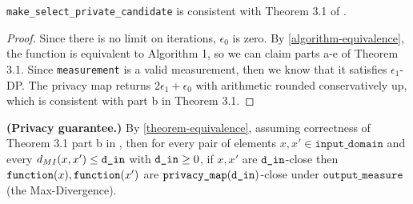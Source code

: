 \documentclass{article}
\begin{document}
\begin{theorem}
    \label{theorem-equivalence}
    \texttt{make\_select\_private\_candidate} is consistent with Theorem 3.1 of \cite{liu2018privateselectionprivatecandidates}.
\end{theorem}

\begin{proof}
    Since there is no limit on iterations, $\epsilon_0$ is zero.
    By \ref{algorithm-equivalence}, the function is equivalent to Algorithm 1, so we can claim parts a-e of Theorem 3.1.
    Since \texttt{measurement} is a valid measurement, then we know that it satisfies $\epsilon_1$-DP.
    The privacy map returns $2\epsilon_1 + \epsilon_0$ with arithmetic rounded conservatively up,
    which is consistent with part b in Theorem 3.1.
\end{proof}

\textbf{(Privacy guarantee.)}
By \ref{theorem-equivalence}, assuming correctness of Theorem 3.1 part b in \cite{liu2018privateselectionprivatecandidates},
then for every pair of elements $x, x' \in \texttt{input\_domain}$ and every $d_{MI}(x, x') \le \texttt{d\_in}$ with $\texttt{d\_in} \ge 0$,
if $x, x'$ are $\texttt{d\_in}$-close then $\texttt{function}(x), \texttt{function}(x')$ are $\texttt{privacy\_map}(\texttt{d\_in})$-close under $\texttt{output\_measure}$ (the Max-Divergence).



\end{document}
